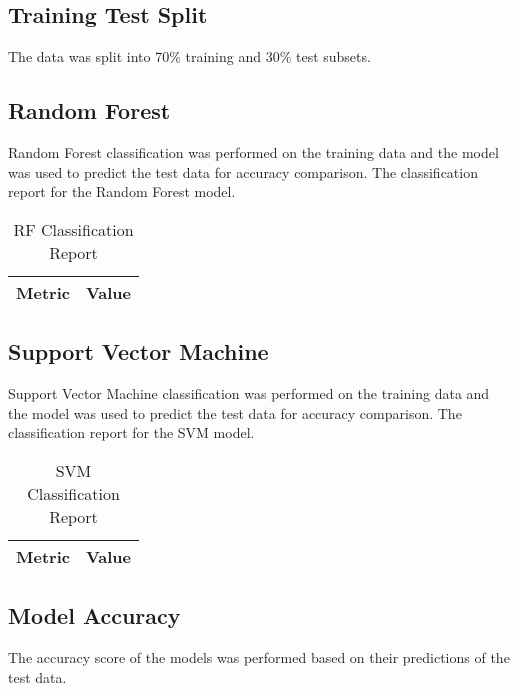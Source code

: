 \documentclass{article} %
\begin{document}
\subsection{Training Test Split}

The data was split into 70\% training and 30\% test subsets.

\subsection{Random Forest}

Random Forest classification was performed on the training data and the model was used to predict the test data for accuracy comparison. The classification report for the Random Forest model.

\begin{table}[h]
    \centering
    \caption{RF Classification Report}
    \label{tab:rf_classification_report}
    \begin{tabular}{ll}
        \toprule
        Metric & Value \\
        \midrule
        \bottomrule
    \end{tabular}
\end{table}

\subsection{Support Vector Machine}

Support Vector Machine classification was performed on the training data and the model was used to predict the test data for accuracy comparison. The classification report for the SVM model.

\begin{table}[h]
    \centering
    \caption{SVM Classification Report}
    \label{tab:svm_classification_report}
    \begin{tabular}{ll}
        \toprule
        Metric & Value \\
        \midrule
        \bottomrule
    \end{tabular}
\end{table}

\subsection{Model Accuracy}

The accuracy score of the models was performed based on their predictions of the test data.
\end{document}
